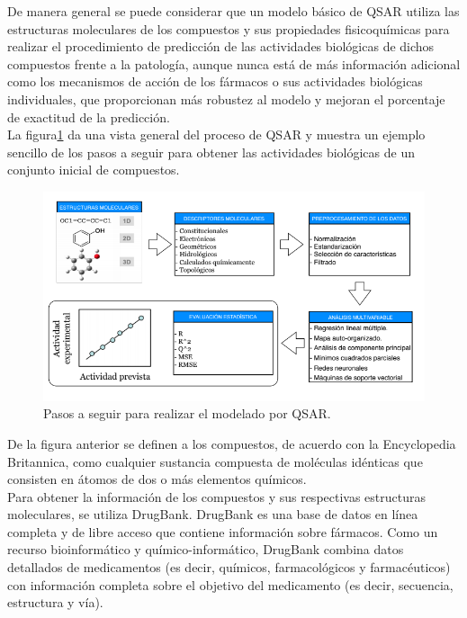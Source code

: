 \noindent De manera general se puede considerar que un modelo básico de QSAR utiliza las estructuras moleculares de los compuestos y sus propiedades fisicoquímicas para realizar el procedimiento de predicción de las actividades biológicas de dichos compuestos frente a la patología, aunque nunca está de más información adicional como los mecanismos de acción de los fármacos o sus actividades biológicas individuales, que proporcionan más robustez al modelo y mejoran el porcentaje de exactitud de la predicción.\\

\noindent La figura\ref{figura1} da una vista general del proceso de QSAR y muestra un ejemplo sencillo de los pasos a seguir para obtener las actividades biológicas de un conjunto inicial de compuestos.\\

\begin{figure}[H]
    \centering
    \includegraphics[scale=0.45]{Capitulo1/figuras/figura1.png}
    \caption{Pasos a seguir para realizar el modelado por QSAR.}
    \label{figura1}
\end{figure}
\noindent De la figura anterior se definen a los compuestos, de acuerdo con la Encyclopedia Britannica, como cualquier sustancia compuesta de moléculas idénticas que consisten en átomos de dos o más elementos químicos.\cite{8}\\

\noindent Para obtener la información de los compuestos y sus respectivas estructuras moleculares, se utiliza DrugBank. DrugBank es una base de datos en línea completa y de libre acceso que contiene información sobre fármacos. Como un recurso bioinformático y químico-informático, DrugBank combina datos detallados de medicamentos (es decir, químicos, farmacológicos y farmacéuticos) con información completa sobre el objetivo del medicamento (es decir, secuencia, estructura y vía).\\

